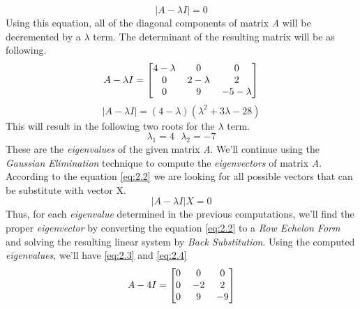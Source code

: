 \documentclass[12pt]{article}
\numberwithin{equation}{section}
\numberwithin{table}{section}
\numberwithin{figure}{section}
\begin{document}
\begin{equation}\label{eq:2.1}
| A - \lambda I |= 0
\end{equation}
Using this equation, all of the diagonal components of matrix \textit{A} will be decremented by a $\lambda$ term. The determinant of the resulting matrix will be as following.
$$
	A - \lambda I = 
		\renewcommand\arraystretch{1}
		\setlength\arraycolsep{6pt}
	\begin{bmatrix}
	4-\lambda & 0 & 0 \\
	0 & 2-\lambda & 2 \\
	0 & 9 & -5-\lambda \\
	\end{bmatrix}	
$$
$$
| A - \lambda I | = (4-\lambda)(\lambda^2 + 3\lambda - 28)
$$
This will result in the following two roots for the $\lambda$ term.
$$
	\boxed{\lambda_1 = 4} \ \ \ \boxed{\lambda_2 = -7}
$$
These are the \textit{eigenvalues} of the given matrix \textit{A}. We'll continue using the \textit{Gaussian Elimination} technique to compute the \textit{eigenvectors} of matrix \textit{A}. According to the equation \ref{eq:2.2} we are looking for all possible vectors that can be substitute with vector X.
\begin{equation}\label{eq:2.2}
| A - \lambda I |X= 0
\end{equation}
Thus, for each \textit{eigenvalue} determined in the previous computations, we'll find the proper \textit{eigenvector} by converting the equation \ref{eq:2.2} to a \textit{Row Echelon Form} and solving the resulting linear system by \textit{Back Substitution}. Using the computed \textit{eigenvalues}, we'll have \ref{eq:2.3} and \ref{eq:2.4}
\begin{equation}\label{eq:2.3}
	A - 4I = 
		\renewcommand\arraystretch{1}
		\setlength\arraycolsep{6pt}
		\begin{bmatrix}
		0 & 0 & 0 \\
		0 & -2 & 2 \\
		0 & 9 & -9 \\
		\end{bmatrix}
\end{equation}
\end{document}

